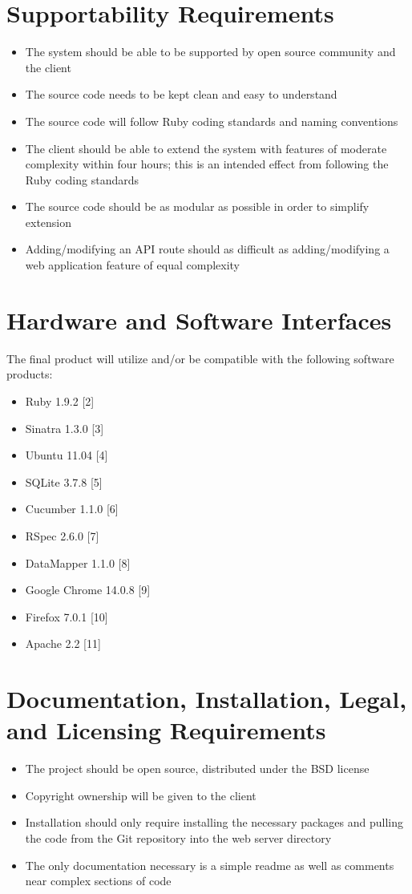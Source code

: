\documentclass{article}
\begin{document}
\section{Supportability Requirements}
\begin{itemize}
\item The system should be able to be supported by open source community and the client
\item The source code needs to be kept clean and easy to understand
\item The source code will follow Ruby coding standards and naming conventions
\item The client should be able to extend the system with features of moderate complexity within four hours; this is an intended effect from following the Ruby coding standards
\item The source code should be as modular as possible in order to simplify extension
\item Adding/modifying an API route should as difficult as adding/modifying a web application feature of equal complexity
\end{itemize}

\section{Hardware and Software Interfaces}
The final product will utilize and/or be compatible with the following software products:\\
\begin{itemize}
\item Ruby 1.9.2 [2]
\item Sinatra 1.3.0 [3]
\item Ubuntu 11.04 [4]
\item SQLite 3.7.8 [5]
\item Cucumber 1.1.0 [6]
\item RSpec 2.6.0 [7]
\item DataMapper 1.1.0 [8]
\item Google Chrome 14.0.8 [9]
\item Firefox 7.0.1 [10]
\item Apache 2.2 [11]
\end{itemize}

\section{Documentation, Installation, Legal, and Licensing Requirements}
\begin{itemize}
\item The project should be open source, distributed under the BSD license
\item Copyright ownership will be given to the client
\item Installation should only require installing the necessary packages and pulling the code from the Git repository into the web server directory
\item The only documentation necessary is a simple readme as well as comments near complex sections of code
\end{itemize}
\end{document}
